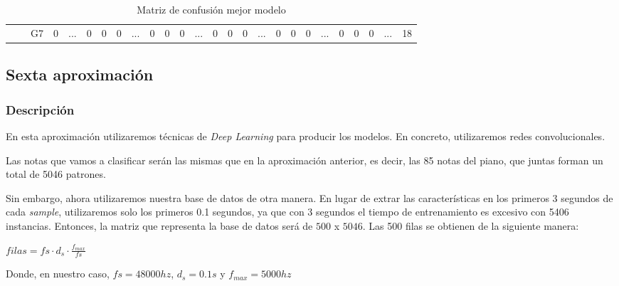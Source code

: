 \documentclass[12pt]{article}
\begin{document}
\begin{table}[!ht]
{\begin{tabular}{clcccccccccccccccccccccccc}
									& \multicolumn{1}{l|}{} & \multicolumn{1}{c|}{G7}   & \multicolumn{1}{c|}{0}    & \multicolumn{1}{c|}{...}                  & \multicolumn{1}{c|}{0}    & \multicolumn{1}{c|}{0}    & \multicolumn{1}{c|}{0}  & \multicolumn{1}{c|}{...}                  & \multicolumn{1}{c|}{0}  & \multicolumn{1}{c|}{0}  & \multicolumn{1}{c|}{0}  & \multicolumn{1}{c|}{...}                  & \multicolumn{1}{c|}{0}    & \multicolumn{1}{c|}{0}    & \multicolumn{1}{c|}{0}    & \multicolumn{1}{c|}{...}                  & \multicolumn{1}{c|}{0}  & \multicolumn{1}{c|}{0}  & \multicolumn{1}{c|}{0}    & \multicolumn{1}{c|}{...}                  & \multicolumn{1}{c|}{0}    & \multicolumn{1}{c|}{0}    & \multicolumn{1}{c|}{0}  & \multicolumn{1}{c|}{...}                  & \multicolumn{1}{c|}{18} \\ \cline{3-26} 
		\end{tabular}	
	}
	\caption{Matriz de confusión mejor modelo}
	\label{Tab:confusion_matrix_5}
\end{table}


\subsection{Sexta aproximación}
\label{Sexta aproximación}

\subsubsection{Descripción}
En esta aproximación utilizaremos técnicas de \textit{Deep Learning} para producir los modelos.
En concreto, utilizaremos redes convolucionales.

\bigskip
Las notas que vamos a clasificar serán las mismas que en la aproximación anterior, es decir, las 
85 notas del piano, que juntas forman un total de 5046 patrones.

\bigskip
Sin embargo, ahora utilizaremos nuestra base de datos de otra manera. En lugar de extrar las características
en los primeros 3 segundos de cada \textit{sample}, utilizaremos
solo los primeros 0.1 segundos, ya que con 3 segundos el tiempo de entrenamiento es excesivo con 
5406 instancias. Entonces, la matriz que representa la base de datos será de $500$ x $5046$. Las 500 filas
se obtienen de la siguiente manera: 

\bigskip
$filas = fs \cdot d_s \cdot \frac{f_{max}}{fs}$ 

\bigskip
Donde, en nuestro caso, $fs = 48000hz$, $d_s = 0.1s$ y $f_{max} = 5000hz$
\end{document}
